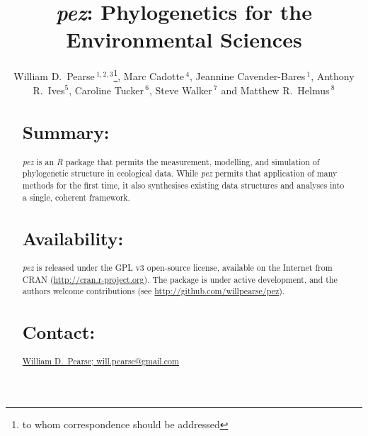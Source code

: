 \documentclass{bioinfo}
\begin{document}

\title[\emph{pez}]{\emph{pez}: Phylogenetics for the Environmental
  Sciences} \author[Pearse \textit{et~al}]{William D.\
  Pearse\,$^{1,2,3}$\footnote{to whom correspondence should be
    addressed}, Marc Cadotte\,$^{4}$, Jeannine Cavender-Bares\,$^1$,
  Anthony R.\ Ives$^5$, Caroline Tucker\,$^6$, Steve Walker\,$^7$ and
  Matthew R.\ Helmus\,$^8$} \address{$^1$Department of Ecology,
  Evolution, and Behavior, University of Minnesota, 100 Ecology
  Building, 1987 Upper Buford Circle, Saint Paul, Minnesota, USA,
  $^2$Department of Biology, McGill University, 1205 Avenue Docteur
  Penfield, Montr\'{e}al, Qu\'{e}bec, Canada, $^3$D\'{e}partement des
  Sciences Biologiques, Universit\'{e} du Qu\'{e}bec \`{a}
  Montr\'{e}al, Succursale Centre-ville, Montr\'{e}al, Qu\'{e}bec,
  Canada, $^4$Department of Biological Sciences, University of
  Toronto–Scarborough, 1265 Military Trail, Scarborough, Ontario,
  Canada, $^5$Department of Zoology, University of Wisconsin, Madison,
  Wisconsin, USA $^6$Department of Ecology and Evolutionary Biology,
  University of Colorado, Boulder, CO, USA, $^7$Department of
  Mathematics and Statistics, McMaster University, Hamilton, Ontario,
  Canada, $^8$Department of Animal Ecology, Vrije Universiteit, 1081
  HV, Amsterdam, The Netherlands} \history{} \editor{}
\maketitle
\begin{abstract}
\section{Summary:}
\emph{pez} is an \emph{R} package that permits the measurement,
modelling, and simulation of phylogenetic structure in ecological
data. While \emph{pez} permits that application of many methods for
the first time, it also synthesises existing data structures and
analyses into a single, coherent framework.
\section{Availability:}
\emph{pez} is released under the GPL v3 open-source license, available
on the Internet from CRAN
(\href{http://cran.r-project.org}{http://cran.r-project.org}). The
package is under active development, and the authors welcome
contributions (see
\href{http://github.com/willpearse/pez}{http://github.com/willpearse/pez}).
\section{Contact:} \href{will.pearse@gmail.com}{William D.\ Pearse; will.pearse@gmail.com}
\end{abstract}
\end{document}
